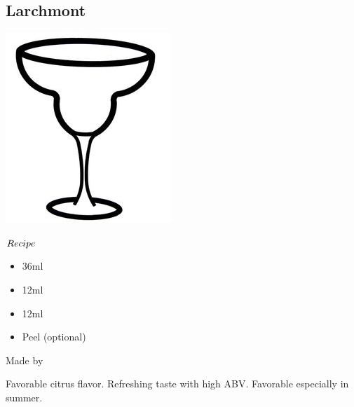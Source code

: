 \subsection{Larchmont}
\vspace{-7mm}
\hspace{34mm}
\includegraphics[scale=.05]{cocktail_glass_snow.jpg}
\vspace{2.5mm}
\begin{itembox}[l]{\boldmath $Recipe$}
\begin{itemize}
\setlength{\parskip}{0cm}
\setlength{\itemsep}{0cm}
\item \rum 36ml
\item \oc 12ml
\item \lj 12ml
\item \orange Peel (optional)
\end{itemize}
\vspace{-4mm}
Made by \shake
\end{itembox}
Favorable citrus flavor. Refreshing taste with high ABV. Favorable especially in summer.
